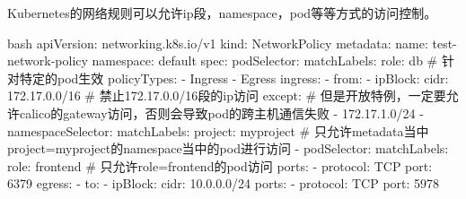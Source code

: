 Kubernetes的网络规则可以允许ip段，namespace，pod等等方式的访问控制。
\begin{code-block}{bash}
apiVersion: networking.k8s.io/v1
kind: NetworkPolicy
metadata:
  name: test-network-policy
  namespace: default
spec:
  podSelector:
    matchLabels:
      role: db                # 针对特定的pod生效
  policyTypes:
  - Ingress
  - Egress
  ingress:
  - from:
    - ipBlock:
        cidr: 172.17.0.0/16   # 禁止172.17.0.0/16段的ip访问
        except:               # 但是开放特例，一定要允许calico的gateway访问，否则会导致pod的跨主机通信失败
        - 172.17.1.0/24
    - namespaceSelector:
        matchLabels:
          project: myproject  # 只允许metadata当中project=myproject的namespace当中的pod进行访问
    - podSelector:
        matchLabels:
          role: frontend      # 只允许role=frontend的pod访问
    ports:
    - protocol: TCP
      port: 6379
  egress:
  - to:
    - ipBlock:
        cidr: 10.0.0.0/24
    ports:
    - protocol: TCP
      port: 5978
\end{code-block}









